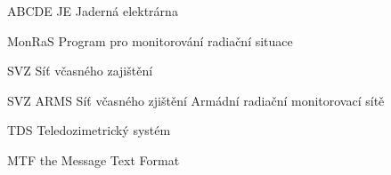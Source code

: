 \begin{seznamzkratek}{ABCDE}
	      {JE}
	      {Jaderná elektrárna}
	     	  
	      {MonRaS}
	      {Program pro monitorování radiační situace}
	     	  
	      {SVZ}
	      {Síť včasného zajištění}
	     	  
	      {SVZ ARMS}
	      {Síť včasného zjištění Armádní radiační monitorovací sítě}
	      
	      {TDS}
	      {Teledozimetrický systém}	   
	      
	      {MTF}
	      {the Message Text Format}	         
	      	            	      

\end{seznamzkratek}